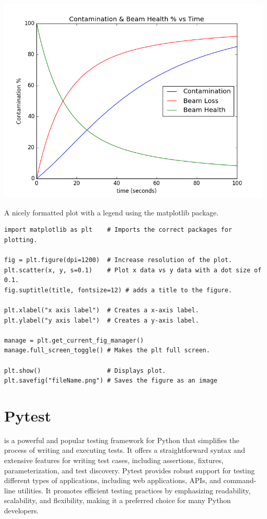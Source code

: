 \includegraphics[width=0.5\linewidth]{./Images/Figures/figure_1-4}

A nicely formatted plot with a legend using the matplotlib package.
\begin{lstlisting}
import matplotlib as plt    # Imports the correct packages for plotting.

fig = plt.figure(dpi=1200)  # Increase resolution of the plot.
plt.scatter(x, y, s=0.1)    # Plot x data vs y data with a dot size of 0.1.
fig.suptitle(title, fontsize=12) # adds a title to the figure.

plt.xlabel("x axis label")  # Creates a x-axis label.
plt.ylabel("y axis label")  # Creates a y-axis label.

manage = plt.get_current_fig_manager()
manage.full_screen_toggle() # Makes the plt full screen.

plt.show()                  # Displays plot.
plt.savefig("fileName.png") # Saves the figure as an image
\end{lstlisting}















\section{Pytest }

 is a powerful and popular testing framework for Python that simplifies the process of writing and executing tests. It offers a straightforward syntax and extensive features for writing test cases, including assertions, fixtures, parameterization, and test discovery. Pytest provides robust support for testing different types of applications, including web applications, APIs, and command-line utilities. It promotes efficient testing practices by emphasizing readability, scalability, and flexibility, making it a preferred choice for many Python developers.

